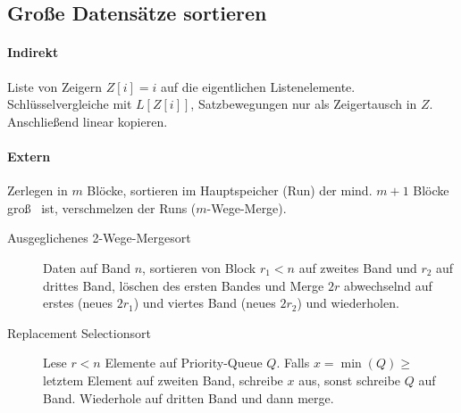 \subsection{Gro\ss e Datensätze sortieren}

\paragraph{Indirekt}
Liste von Zeigern $Z[i] = i$ auf die eigentlichen Listenelemente. Schlüsselvergleiche mit $L[Z[i]]$, Satzbewegungen nur als Zeigertausch in $Z$. Anschlie\ss end linear kopieren.

\paragraph{Extern}
Zerlegen in $m$ Blöcke, sortieren im Hauptspeicher (Run) der mind. $m + 1$ Blöcke gro\ss~ ist, verschmelzen der Runs ($m$-Wege-Merge).

\begin{description}
  \item [Ausgeglichenes 2-Wege-Mergesort]
        Daten auf Band $n$, sortieren von Block $r_1 < n$ auf zweites Band und $r_2$ auf drittes Band, löschen des ersten Bandes und Merge $2r$ abwechselnd auf erstes (neues $2r_1$) und viertes Band (neues $2r_2$) und wiederholen.

  \item [Replacement Selectionsort]
        Lese $r < n$ Elemente auf Priority-Queue $Q$. Falls $x = \min(Q) \geq$ letztem Element auf zweiten Band, schreibe $x$ aus, sonst schreibe $Q$ auf Band. Wiederhole auf dritten Band und dann merge.
\end{description}

\mzBreak\

